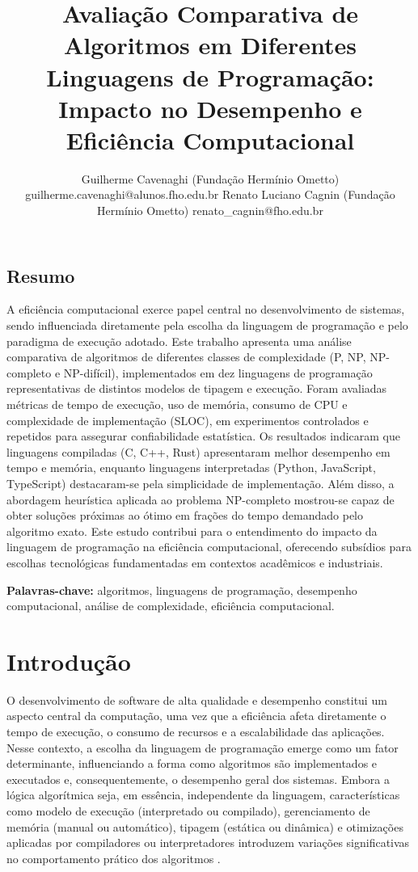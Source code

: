 \documentclass[12pt, a4paper]{article}
\title{Avaliação Comparativa de Algoritmos em Diferentes Linguagens de Programação: Impacto no Desempenho e Eficiência Computacional}
\author{Guilherme Cavenaghi (Fundação Hermínio Ometto) guilherme.cavenaghi@alunos.fho.edu.br
Renato Luciano Cagnin (Fundação Hermínio Ometto) renato\_cagnin@fho.edu.br}
\date{}
\begin{document}
\maketitle


\begin{flushleft}
\section*{Resumo}
\noindent A eficiência computacional exerce papel central no desenvolvimento de sistemas, sendo influenciada diretamente pela escolha da linguagem de programação e pelo paradigma de execução adotado. Este trabalho apresenta uma análise comparativa de algoritmos de diferentes classes de complexidade (P, NP, NP-completo e NP-difícil), implementados em dez linguagens de programação representativas de distintos modelos de tipagem e execução. Foram avaliadas métricas de tempo de execução, uso de memória, consumo de CPU e complexidade de implementação (SLOC), em experimentos controlados e repetidos para assegurar confiabilidade estatística. Os resultados indicaram que linguagens compiladas (C, C++, Rust) apresentaram melhor desempenho em tempo e memória, enquanto linguagens interpretadas (Python, JavaScript, TypeScript) destacaram-se pela simplicidade de implementação. Além disso, a abordagem heurística aplicada ao problema NP-completo mostrou-se capaz de obter soluções próximas ao ótimo em frações do tempo demandado pelo algoritmo exato. Este estudo contribui para o entendimento do impacto da linguagem de programação na eficiência computacional, oferecendo subsídios para escolhas tecnológicas fundamentadas em contextos acadêmicos e industriais. 

\vspace{0.15cm}
\noindent\textbf{Palavras-chave:} algoritmos, linguagens de programação, desempenho computacional, análise de complexidade, eficiência computacional.
\end{flushleft}


\section{Introdução}
O desenvolvimento de software de alta qualidade e desempenho constitui um aspecto central da computação, uma vez que a eficiência afeta diretamente o tempo de execução, o consumo de recursos e a escalabilidade das aplicações. Nesse contexto, a escolha da linguagem de programação emerge como um fator determinante, influenciando a forma como algoritmos são implementados e executados e, consequentemente, o desempenho geral dos sistemas. Embora a lógica algorítmica seja, em essência, independente da linguagem, características como modelo de execução (interpretado ou compilado), gerenciamento de memória (manual ou automático), tipagem (estática ou dinâmica) e otimizações aplicadas por compiladores ou interpretadores introduzem variações significativas no comportamento prático dos algoritmos .  
\end{document}
